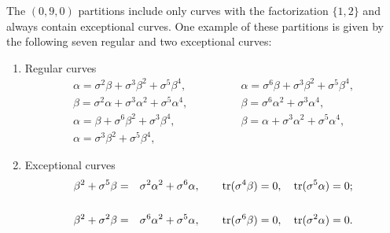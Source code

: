 \documentclass[quantumrep,article,accept,pdftex,moreauthors]{Definitions/mdpi}
\DeclareMathOperator{\tr}{tr}
\begin{document}
The $(0,9,0)$ partitions include only curves with the factorization $\{1,2\}$
and always contain exceptional curves. One example of these partitions is given
by the following seven regular and two exceptional curves:

\begin{enumerate}[label = (\alph*),labelsep=2mm]
  \item Regular curves
\begin{equation}
      \begin{array}{ll}
        \alpha = \sigma^{2}\beta + \sigma^{3}\beta^{2} + \sigma^{5}\beta^{4},
        \qquad\qquad
        & \alpha = \sigma^{6}\beta + \sigma^{3}\beta^{2} + \sigma^{5}\beta^{4},
        \\[5pt] 
        \beta = \sigma^{2}\alpha + \sigma^{3}\alpha^{2} + \sigma^{5}\alpha^{4},
        \qquad\qquad
        & \beta = \sigma^{6}\alpha^{2} + \sigma^{3}\alpha^{4}, \\[5pt] 
        \alpha = \beta + \sigma^{6}\beta^{2} + \sigma^{3}\beta^{4},
        \qquad\qquad
        & \beta = \alpha + \sigma^{3}\alpha^{2} + \sigma^{5}\alpha^{4}, \\[5pt] 
        \alpha = \sigma^{3}\beta^{2} + \sigma^{5}\beta^{4},
        \qquad\qquad
        & 
      \end{array}%
    \end{equation}

  \item Exceptional curves
\begin{eqnarray}
      \beta^{2}+\sigma^{5}\beta
      &=& \sigma^{2}\alpha^{2}+\sigma^{6}\alpha,
      \qquad \tr(\sigma^{4}\beta)=0,\quad \tr(\sigma^{5}\alpha) = 0;
      \notag \\
      && \\
      \beta^{2}+\sigma^{2}\beta
      &=& \sigma^{6}\alpha^{2} + \sigma^{5}\alpha,
      \qquad \tr(\sigma^{6}\beta) = 0,
      \quad \tr(\sigma^{2}\alpha) = 0.
      \notag
    \end{eqnarray}
\end{enumerate}

\section[\appendixname~\thesection]{}
\label{appC}
\end{document}
